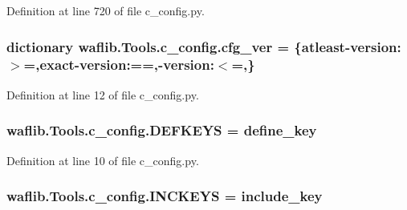 Definition at line 720 of file c\+\_\+config.\+py.

\subsubsection[{\texorpdfstring{cfg\+\_\+ver}{cfg_ver}}]{\setlength{\rightskip}{0pt plus 5cm}dictionary waflib.\+Tools.\+c\+\_\+config.\+cfg\+\_\+ver = \{\textquotesingle{}atleast-\/{\bf version}\textquotesingle{}\+:\textquotesingle{}$>$=\textquotesingle{},\textquotesingle{}exact-\/{\bf version}\textquotesingle{}\+:\textquotesingle{}==\textquotesingle{},-\/{\bf version}\textquotesingle{}\+:\textquotesingle{}$<$=\textquotesingle{},\}}\hypertarget{namespacewaflib_1_1_tools_1_1c__config_a41821fd2ecc9c5265c2d31301cfd9303}{}\label{namespacewaflib_1_1_tools_1_1c__config_a41821fd2ecc9c5265c2d31301cfd9303}


Definition at line 12 of file c\+\_\+config.\+py.

\subsubsection[{\texorpdfstring{D\+E\+F\+K\+E\+YS}{DEFKEYS}}]{ waflib.\+Tools.\+c\+\_\+config.\+D\+E\+F\+K\+E\+YS = \textquotesingle{}define\+\_\+key\textquotesingle{}}\hypertarget{namespacewaflib_1_1_tools_1_1c__config_a423497940f1079ce7d47a2bc7c2f3d21}{}\label{namespacewaflib_1_1_tools_1_1c__config_a423497940f1079ce7d47a2bc7c2f3d21}


Definition at line 10 of file c\+\_\+config.\+py.

\subsubsection[{\texorpdfstring{I\+N\+C\+K\+E\+YS}{INCKEYS}}]{ waflib.\+Tools.\+c\+\_\+config.\+I\+N\+C\+K\+E\+YS = \textquotesingle{}include\+\_\+key\textquotesingle{}}\hypertarget{namespacewaflib_1_1_tools_1_1c__config_a4fe2646ae07d79f9418b071ee264aec0}{}\label{namespacewaflib_1_1_tools_1_1c__config_a4fe2646ae07d79f9418b071ee264aec0}


